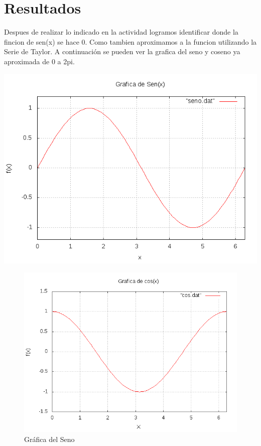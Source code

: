 \documentclass[12pt,a4paper,openright]{article}
\begin{document}
\section{Resultados}
Despues de realizar lo indicado en la actividad logramos identificar donde la fincion de sen(x) se hace 0. Como tambien aproximamos a la funcion utilizando la Serie de Taylor. A continuación se pueden ver la grafica del seno y coseno ya aproximada de 0 a 2pi.






\includegraphics[scale=1]{sen.png} 
\begin{figure}[htb]
\includegraphics[scale=1]{coseno.png} 
\caption{Gráfica del Seno}
\end{figure}
\end{document}
